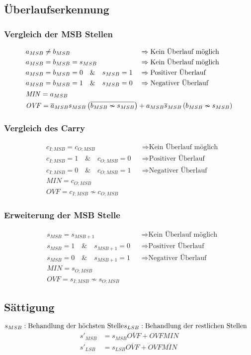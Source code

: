 \subsection{Überlaufserkennung}
\begin{multicols}{2}
	\subsubsection{Vergleich der MSB Stellen}
	\begin{align*}
	&\begin{aligned}
	&a_{MSB}\neq b_{MSB}\hfill&&\Rightarrow \text{Kein Überlauf möglich}\\
	&a_{MSB}=b_{MSB}=s_{MSB}&&\Rightarrow \text{Kein Überlauf möglich}\\
	&a_{MSB}=b_{MSB}=0 \quad\&\quad s_{MSB}=1&&\Rightarrow \text{Positiver Überlauf}\\
	&a_{MSB}=b_{MSB}=1 \quad\&\quad s_{MSB}=0&&\Rightarrow \text{Negativer Überlauf}
	\end{aligned}\\
	&\mathit{MIN}=a_{MSB}\\
	&\mathit{OVF}=\overline{a}_{MSB}s_{MSB}\left(\overline{b_{MSB}\nsim s_{MSB}}\right)+a_{MSB}\overline{s}_{MSB}\left(b_{MSB}\nsim s_{MSB}\right)
	\end{align*}
		
	\subsubsection{Vergleich des Carry}
	\begin{align*}
	&c_{I;MSB}= c_{O;MSB}&&\Rightarrow \text{Kein Überlauf möglich}\\
	&c_{I;MSB}=1\quad\&\quad c_{O;MSB}=0&&\Rightarrow \text{Positiver Überlauf}\\
	&c_{I;MSB}=0\quad\&\quad c_{O;MSB}=1&&\Rightarrow \text{Negativer Überlauf}\\
	&\mathit{MIN}=c_{O;MSB}\\
	&\mathit{OVF}=c_{I;MSB}\nsim c_{O;MSB}
	\end{align*}
		
	\subsubsection{Erweiterung der MSB Stelle}
	\begin{align*}
	&s_{MSB}= s_{MSB+1}&&\Rightarrow \text{Kein Überlauf möglich}\\
	&s_{MSB}=1\quad\&\quad s_{MSB+1}=0&&\Rightarrow \text{Positiver Überlauf}\\
	&s_{MSB}=0\quad\&\quad s_{MSB+1}=1&&\Rightarrow \text{Negativer Überlauf}\\
	&\mathit{MIN}=s_{O;MSB}\\
	&\mathit{OVF}=s_{I;MSB}\nsim s_{O;MSB}
	\end{align*}
\end{multicols}


\subsection{Sättigung}
\(
s_{MSB}: \text{Behandlung der höchsten Stelle}\\
s_{LSB}: \text{Behandlung der restlichen Stellen}
\)
\begin{align*}
s'_{MSB}&=s_{MSB}\overline{\mathit{OVF}}+\mathit{OVF}\mathit{MIN}\\
s'_{LSB}&=s_{LSB}\overline{\mathit{OVF}}+\mathit{OVF}\overline{{MIN}}
\end{align*}